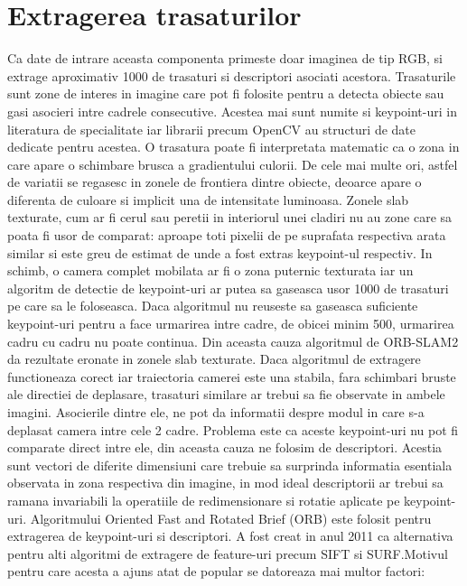 \documentclass[12pt,a4paper]{report}
\begin{document}
\section{Extragerea trasaturilor} 
Ca date de intrare aceasta componenta primeste doar imaginea de tip RGB, si extrage
aproximativ 1000 de trasaturi si descriptori asociati acestora. Trasaturile sunt zone
de interes in imagine care pot fi folosite pentru a detecta obiecte sau gasi asocieri 
intre cadrele consecutive. Acestea mai sunt numite si keypoint-uri in literatura de 
specialitate iar librarii precum OpenCV au structuri de date dedicate pentru acestea.
O trasatura poate fi interpretata matematic ca o zona in care apare o schimbare 
brusca a gradientului culorii. De cele mai multe ori, astfel de variatii se regasesc 
in zonele de frontiera dintre obiecte, deoarce apare o diferenta
de culoare si implicit una de intensitate luminoasa. Zonele slab texturate, cum ar 
fi cerul sau peretii in interiorul unei cladiri nu au zone care sa poata fi usor de 
comparat: aproape toti pixelii de pe suprafata respectiva arata similar si
este greu de estimat de unde a fost extras keypoint-ul respectiv. In schimb, o camera 
complet mobilata ar fi o zona puternic texturata iar un algoritm de detectie de 
keypoint-uri ar putea sa gaseasca usor 1000 de trasaturi pe care sa le foloseasca.
Daca algoritmul nu reuseste sa gaseasca suficiente keypoint-uri pentru a face urmarirea
intre cadre, de obicei minim 500, urmarirea cadru cu cadru nu poate continua. Din aceasta
cauza algoritmul de ORB-SLAM2 da rezultate eronate in zonele slab texturate. Daca algoritmul
de extragere functioneaza corect iar traiectoria camerei este una stabila, fara schimbari
bruste ale directiei de deplasare, trasaturi similare ar trebui sa fie observate in ambele
imagini. Asocierile dintre ele, ne pot da informatii despre modul in care s-a deplasat 
camera intre cele 2 cadre. Problema este ca aceste keypoint-uri nu pot fi comparate direct
intre ele, din aceasta cauza ne folosim de descriptori. Acestia sunt vectori de diferite 
dimensiuni care trebuie sa surprinda informatia esentiala observata in zona respectiva din
imagine, in mod ideal descriptorii ar trebui sa ramana invariabili la operatiile de 
redimensionare si rotatie aplicate pe keypoint-uri. 
Algoritmului Oriented Fast and Rotated Brief (ORB) este folosit pentru extragerea de 
keypoint-uri si descriptori. A fost creat in anul 2011 ca alternativa pentru alti algoritmi
de extragere de feature-uri precum SIFT si SURF.\@ Motivul pentru care acesta a ajuns atat de popular 
se datoreaza mai multor factori:
\end{document}
